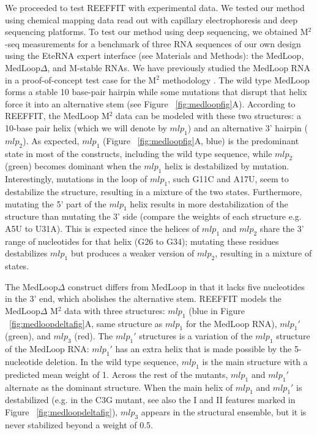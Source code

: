 \documentclass[12pt]{article}
\begin{document}
We proceeded to test REEFFIT with experimental data. We tested our method using chemical mapping data read out with capillary electrophoresis and deep sequencing platforms. To test our method using deep sequencing, we obtained M$^2$-seq measurements for a benchmark of three RNA sequences of our own design using the EteRNA expert interface (see Materials and Methods): the MedLoop, MedLoop$\Delta$, and M-stable RNAs. We have previously studied the MedLoop RNA in a proof-of-concept test case for the M$^2$ methodology \cite{Kladwang2011}. The wild type MedLoop forms a stable 10 base-pair hairpin while some mutations that disrupt that helix force it into an alternative stem (see Figure ~\ref{fig:medloopfig}A). According to REEFFIT, the MedLoop M$^2$ data can be modeled with these two structures: a 10-base pair helix (which we will denote by $mlp_1$) and an alternative 3' hairpin ($mlp_2$). As expected, $mlp_1$ (Figure ~\ref{fig:medloopfig}A,  blue) is the predominant state in most of the constructs, including the wild type sequence, while $mlp_2$ (green) becomes dominant when the $mlp_1$ helix is destabilized by mutation. Interestingly, mutations in the loop of $mlp_1$, such G11C and A17U, seem to destabilize the structure, resulting in a mixture of the two states. Furthermore, mutating the 5' part of the $mlp_1$ helix results in more destabilization of the structure than mutating the 3' side (compare the weights of each structure e.g. A5U to U31A). This is expected since the helices of $mlp_1$ and $mlp_2$ share the 3' range of nucleotides for that helix (G26 to G34); mutating these residues destabilizes $mlp_1$ but produces a weaker version of $mlp_2$, resulting in a mixture of states. 

The MedLoop$\Delta$ construct differs from MedLoop in that it lacks five nucleotides in the 3' end, which abolishes the alternative stem. REEFFIT models the MedLoop$\Delta$ M$^2$ data with three structures: $mlp_1$ (blue in Figure ~\ref{fig:medloopdeltafig}A, same structure as $mlp_1$ for the MedLoop RNA), $mlp_1'$ (green), and $mlp_3$ (red). The $mlp_1'$ structures is a variation  of the $mlp_1$ structure of the MedLoop RNA: $mlp_1'$ has an extra helix that is made possible by the 5-nucleotide deletion. In the wild type sequence, $mlp_1$ is the main structure with a predicted mean weight of 1. Across the rest of the mutants, $mlp_1$ and $mlp_1'$ alternate as the dominant structure. When the main helix of $mlp_1$ and $mlp_1'$ is destabilized (e.g. in the C3G mutant, see also the I and II features marked in Figure ~\ref{fig:medloopdeltafig}), $mlp_3$ appears in the structural ensemble, but it is never stabilized beyond a weight of 0.5. 
\end{document}
